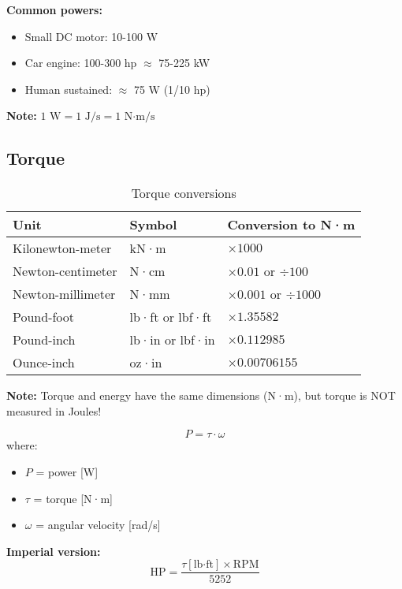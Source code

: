 \textbf{Common powers:}
\begin{itemize}
    \item Small DC motor: 10-100 W
    \item Car engine: 100-300 hp $\approx$ 75-225 kW
    \item Human sustained: $\approx$ 75 W (1/10 hp)
\end{itemize}

\textbf{Note:} $1 \text{ W} = 1 \text{ J/s} = 1 \text{ N·m/s}$

\subsection{Torque}

\begin{table}[H]
\centering
\begin{tabular}{|l|l|l|}
\hline
\rowcolor{blue!20}
\textbf{Unit} & \textbf{Symbol} & \textbf{Conversion to N·m} \\
\hline
Kilonewton-meter & kN·m & $\times 1000$ \\
\hline
Newton-centimeter & N·cm & $\times 0.01$ or $\div 100$ \\
\hline
Newton-millimeter & N·mm & $\times 0.001$ or $\div 1000$ \\
\hline
\rowcolor{yellow!20}
Pound-foot & lb·ft or lbf·ft & $\times 1.35582$ \\
\hline
\rowcolor{yellow!20}
Pound-inch & lb·in or lbf·in & $\times 0.112985$ \\
\hline
\rowcolor{yellow!20}
Ounce-inch & oz·in & $\times 0.00706155$ \\
\hline
\end{tabular}
\caption{Torque conversions}
\end{table}

\textbf{Note:} Torque and energy have the same dimensions (N·m), but torque is NOT measured in Joules!

\begin{tcolorbox}[colback=orange!10!white,colframe=orange!75!black,title=Power-Torque-Speed Relationship]
\begin{equation}
P = \tau \cdot \omega
\end{equation}
where:
\begin{itemize}
    \item $P$ = power [W]
    \item $\tau$ = torque [N·m]
    \item $\omega$ = angular velocity [rad/s]
\end{itemize}

\textbf{Imperial version:}
\begin{equation}
\text{HP} = \frac{\tau[\text{lb·ft}] \times \text{RPM}}{5252}
\end{equation}
\end{tcolorbox}

